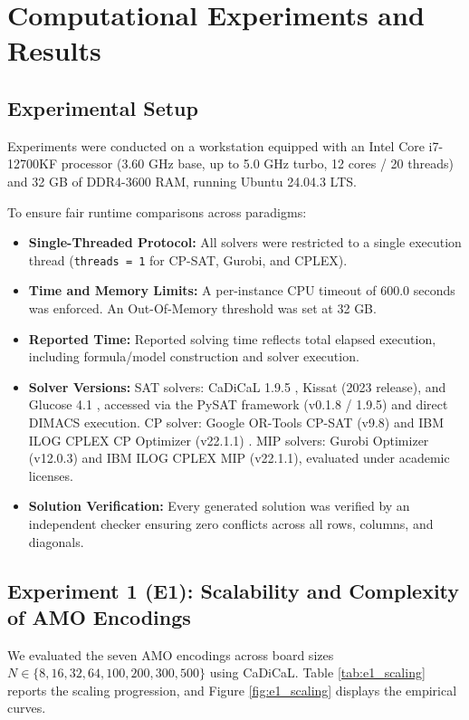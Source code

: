 \documentclass[a4paper,fleqn]{cas-sc}
\begin{document}
\section{Computational Experiments and Results}
\label{sec:experiments}

\subsection{Experimental Setup}
Experiments were conducted on a workstation equipped with an Intel Core i7-12700KF processor (3.60 GHz base, up to 5.0 GHz turbo, 12 cores / 20 threads) and 32 GB of DDR4-3600 RAM, running Ubuntu 24.04.3 LTS. 

To ensure fair runtime comparisons across paradigms:
\begin{itemize}
    \item \textbf{Single-Threaded Protocol:} All solvers were restricted to a single execution thread (\texttt{threads = 1} for CP-SAT, Gurobi, and CPLEX).
    \item \textbf{Time and Memory Limits:} A per-instance CPU timeout of 600.0 seconds was enforced. An Out-Of-Memory threshold was set at 32 GB.
    \item \textbf{Reported Time:} Reported solving time reflects total elapsed execution, including formula/model construction and solver execution.
    \item \textbf{Solver Versions:} SAT solvers: CaDiCaL 1.9.5 \citep{biere2024cadical}, Kissat (2023 release), and Glucose 4.1 \citep{audemard2009predicting}, accessed via the PySAT framework (v0.1.8 / 1.9.5) and direct DIMACS execution. CP solver: Google OR-Tools CP-SAT (v9.8) \citep{google2024ortools} and IBM ILOG CPLEX CP Optimizer (v22.1.1) \citep{ibm2022cplex}. MIP solvers: Gurobi Optimizer (v12.0.3) \citep{gurobi2025} and IBM ILOG CPLEX MIP (v22.1.1), evaluated under academic licenses.
    \item \textbf{Solution Verification:} Every generated solution was verified by an independent checker ensuring zero conflicts across all rows, columns, and diagonals.
\end{itemize}

\subsection{Experiment 1 (E1): Scalability and Complexity of AMO Encodings}
We evaluated the seven AMO encodings across board sizes $N \in \{8, 16, 32, 64, 100, 200, 300, 500\}$ using CaDiCaL. Table \ref{tab:e1_scaling} reports the scaling progression, and Figure \ref{fig:e1_scaling} displays the empirical curves.
\end{document}
